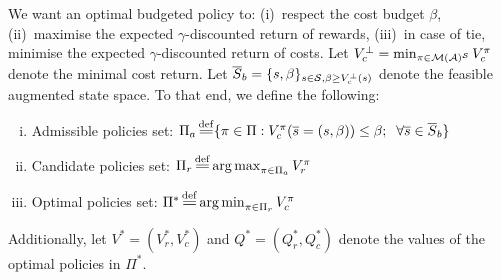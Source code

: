 \documentclass{article}
\begin{document}
\begin{definition}
We want an optimal budgeted policy to: (i)~respect the cost budget $\beta$, (ii)~maximise the expected $\gamma$-discounted return of rewards, (iii)~in case of tie, minimise the expected $\gamma$-discounted return of costs. Let $V_c^\bot = \min_{\pi\in\mathcal{M}(\mathcal{A})^{\mathcal{S}}} V_c^\pi$ denote the minimal cost return. Let $\overline{S}_b = \{s,\beta\}_{s\in\mathcal{S}, \beta\geq V_c^\bot(s)}$ denote the feasible augmented state space. To that end, we define the following:
\begin{enumerate}[(i)]
    \item Admissible policies set: $\Pi_a \eqdef \{\pi\in\Pi: V_c^\pi(\os=(s, \beta)) \leq \beta ;\;\; \forall \os\in\overline{S}_b\}$
    \item Candidate policies set: $\Pi_r \eqdef \argmax_{\pi\in\Pi_a}  V_r^\pi$
    \item Optimal policies set: $\Pi^* \eqdef \argmin_{\pi\in\Pi_r}  V_c^\pi$
\end{enumerate}
Additionally, let $V^* = (V_r^*, V_c^*)$ and $Q^* = (Q_r^*, Q_c^*)$ denote the values of the optimal policies in $\Pi^*$.
\end{definition}
\end{document}
